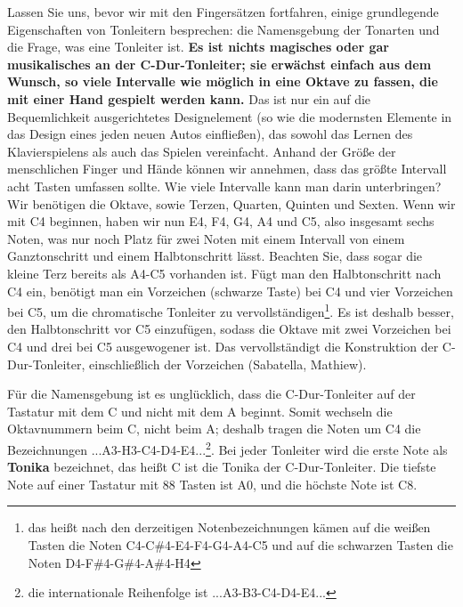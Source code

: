 Lassen Sie uns, bevor wir mit den Fingersätzen fortfahren, einige grundlegende Eigenschaften von Tonleitern besprechen: die Namensgebung der Tonarten und die Frage, was eine Tonleiter ist.
\textbf{Es ist nichts magisches oder gar musikalisches an der C-Dur-Tonleiter; sie erwächst einfach aus dem Wunsch, so viele Intervalle wie möglich in eine Oktave zu fassen, die mit einer Hand gespielt werden kann.}
Das ist nur ein auf die Bequemlichkeit ausgerichtetes Designelement (so wie die modernsten Elemente in das Design eines jeden neuen Autos einfließen), das sowohl das Lernen des Klavierspielens als auch das Spielen vereinfacht.
Anhand der Größe der menschlichen Finger und Hände können wir annehmen, dass das größte Intervall acht Tasten umfassen sollte.
Wie viele Intervalle kann man darin unterbringen?
Wir benötigen die Oktave, sowie Terzen, Quarten, Quinten und Sexten.
Wenn wir mit C4 beginnen, haben wir nun E4, F4, G4, A4 und C5, also insgesamt sechs Noten, was nur noch Platz für zwei Noten mit einem Intervall von einem Ganztonschritt und einem Halbtonschritt lässt.
Beachten Sie, dass sogar die kleine Terz bereits als A4-C5 vorhanden ist.
Fügt man den Halbtonschritt nach C4 ein, benötigt man ein Vorzeichen (schwarze Taste) bei C4 und vier Vorzeichen bei C5, um die chromatische Tonleiter zu vervollständigen\footnote{das heißt nach den derzeitigen Notenbezeichnungen kämen auf die weißen Tasten die Noten C4-C\#4-E4-F4-G4-A4-C5 und auf die schwarzen Tasten die Noten D4-F\#4-G\#4-A\#4-H4}.
Es ist deshalb besser, den Halbtonschritt vor C5 einzufügen, sodass die Oktave mit zwei Vorzeichen bei C4 und drei bei C5 ausgewogener ist.
Das vervollständigt die Konstruktion der C-Dur-Tonleiter, einschließlich der Vorzeichen (Sabatella, Mathiew).

Für die Namensgebung ist es unglücklich, dass die C-Dur-Tonleiter auf der Tastatur mit dem C und nicht mit dem A beginnt.
Somit wechseln die Oktavnummern beim C, nicht beim A; deshalb tragen die Noten um C4 die Bezeichnungen ...A3-H3-C4-D4-E4...\footnote{die internationale Reihenfolge ist ...A3-B3-C4-D4-E4...}.
Bei jeder Tonleiter wird die erste Note als \textbf{Tonika} bezeichnet, das heißt C ist die Tonika der C-Dur-Tonleiter.
Die tiefste Note auf einer Tastatur mit 88 Tasten ist A0, und die höchste Note ist C8.


\label{table}

